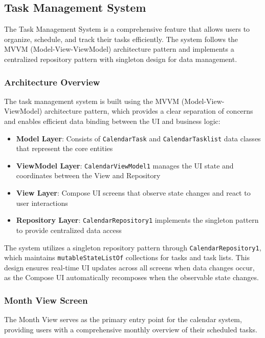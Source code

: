 \subsection{Task Management System}

The Task Management System is a comprehensive feature that allows users to organize, schedule, and track their tasks efficiently. The system follows the MVVM (Model-View-ViewModel) architecture pattern and implements a centralized repository pattern with singleton design for data management.

\subsubsection{Architecture Overview}

The task management system is built using the MVVM (Model-View-ViewModel) architecture pattern, which provides a clear separation of concerns and enables efficient data binding between the UI and business logic:

\begin{itemize}
    \item \textbf{Model Layer}: Consists of \texttt{CalendarTask} and \texttt{CalendarTasklist} data classes that represent the core entities
    \item \textbf{ViewModel Layer}: \texttt{CalendarViewModel1} manages the UI state and coordinates between the View and Repository
    \item \textbf{View Layer}: Compose UI screens that observe state changes and react to user interactions
    \item \textbf{Repository Layer}: \texttt{CalendarRepository1} implements the singleton pattern to provide centralized data access
\end{itemize}

The system utilizes a singleton repository pattern through \texttt{CalendarRepository1}, which maintains \texttt{mutableStateListOf} collections for tasks and task lists. This design ensures real-time UI updates across all screens when data changes occur, as the Compose UI automatically recomposes when the observable state changes.

\subsubsection{Month View Screen}

The Month View serves as the primary entry point for the calendar system, providing users with a comprehensive monthly overview of their scheduled tasks.

